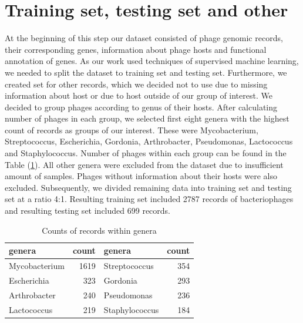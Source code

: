 \section{Training set, testing set and other}
At the beginning of this step our dataset consisted of phage genomic records, their corresponding genes, information about phage hosts and functional annotation of genes.
As our work used techniques of supervised machine learning, we needed to split the dataset to training set and testing set.
Furthermore, we created set for other records, which we decided not to use due to missing information about host or due to host outside of our group of interest.
We decided to group phages according to genus of their hosts.
After calculating number of phages in each group, we selected first eight genera with the highest count of records as groups of our interest.
These were Mycobacterium, Streptococcus, Escherichia, Gordonia, Arthrobacter, Pseudomonas, Lactococcus and Staphylococcus. 
Number of phages within each group can be found in the Table (\ref{tab:counts}).
All other genera were excluded from the dataset due to insufficient amount of samples.
Phages without information about their hosts were also excluded.
Subsequently, we divided remaining data into training set and testing set at a ratio 4:1.
Resulting training set included 2787 records of bacteriophages and resulting testing set included 699 records. 

\begin{table}
  \centering
    \begin{tabular}{ l  r  l  r }
      \hline
      genera & count & genera & count \\
      \hline
      Mycobacterium & 1619 & Streptococcus & 354 \\
      Escherichia & 323 & Gordonia & 293 \\
      Arthrobacter & 240 & Pseudomonas & 236 \\
      Lactococcus & 219 & Staphylococcus & 184 \\
      \hline
    \end{tabular}
    \caption{Counts of records within genera}
    \label{tab:counts}
\end{table}




